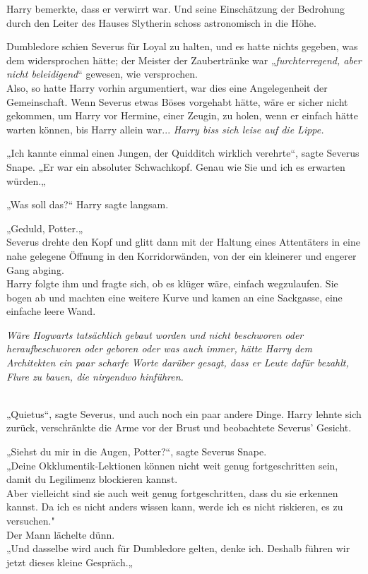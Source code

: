 {Harry bemerkte, dass er verwirrt war. Und seine Einschätzung der Bedrohung durch den Leiter des Hauses Slytherin schoss astronomisch in die Höhe.

Dumbledore schien Severus für Loyal zu halten, und es hatte nichts gegeben, was dem widersprochen hätte; der Meister der Zaubertränke war „\emph{furchterregend, aber nicht beleidigend}“ gewesen, wie versprochen.\\ Also, so hatte Harry vorhin argumentiert, war dies eine Angelegenheit der Gemeinschaft. Wenn Severus etwas Böses vorgehabt hätte, wäre er sicher nicht gekommen, um Harry vor Hermine, einer Zeugin, zu holen, wenn er einfach hätte warten können, bis Harry allein war... \emph{Harry biss sich leise auf die Lippe.}

„Ich kannte einmal einen Jungen, der Quidditch wirklich verehrte“, sagte Severus Snape. „Er war ein absoluter Schwachkopf. Genau wie Sie und ich es erwarten würden.„

„Was soll das?“ Harry sagte langsam.

„Geduld, Potter.„\\ Severus drehte den Kopf und glitt dann mit der Haltung eines Attentäters in eine nahe gelegene Öffnung in den Korridorwänden, von der ein kleinerer und engerer Gang abging.\\ Harry folgte ihm und fragte sich, ob es klüger wäre, einfach wegzulaufen. Sie bogen ab und machten eine weitere Kurve und kamen an eine Sackgasse, eine einfache leere Wand.

\emph{Wäre Hogwarts tatsächlich gebaut worden und nicht beschworen oder heraufbeschworen oder geboren oder was auch immer, hätte Harry dem Architekten ein paar scharfe Worte darüber gesagt, dass er Leute dafür bezahlt, Flure zu bauen, die nirgendwo hinführen.\\ }\strut \\ „Quietus“, sagte Severus, und auch noch ein paar andere Dinge. Harry lehnte sich zurück, verschränkte die Arme vor der Brust und beobachtete Severus' Gesicht.

„Siehst du mir in die Augen, Potter?“, sagte Severus Snape.\\ „Deine Okklumentik-Lektionen können nicht weit genug fortgeschritten sein, damit du Legilimenz blockieren kannst.\\ Aber vielleicht sind sie auch weit genug fortgeschritten, dass du sie erkennen kannst. Da ich es nicht anders wissen kann, werde ich es nicht riskieren, es zu versuchen."\\ Der Mann lächelte dünn.\\ „Und dasselbe wird auch für Dumbledore gelten, denke ich. Deshalb führen wir jetzt dieses kleine Gespräch.„

}
